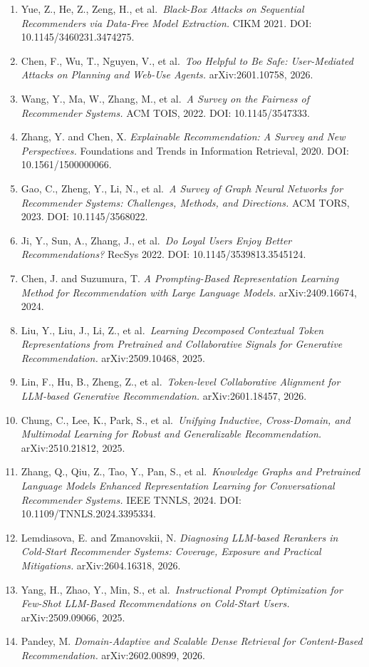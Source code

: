 \begin{enumerate}
\item
  Yue, Z., He, Z., Zeng, H., et al.~\emph{Black-Box Attacks on Sequential Recommenders via Data-Free Model Extraction.} CIKM 2021. DOI: 10.1145/3460231.3474275.
\item
  Chen, F., Wu, T., Nguyen, V., et al.~\emph{Too Helpful to Be Safe: User-Mediated Attacks on Planning and Web-Use Agents.} arXiv:2601.10758, 2026.
\item
  Wang, Y., Ma, W., Zhang, M., et al.~\emph{A Survey on the Fairness of Recommender Systems.} ACM TOIS, 2022. DOI: 10.1145/3547333.
\item
  Zhang, Y. and Chen, X. \emph{Explainable Recommendation: A Survey and New Perspectives.} Foundations and Trends in Information Retrieval, 2020. DOI: 10.1561/1500000066.
\item
  Gao, C., Zheng, Y., Li, N., et al.~\emph{A Survey of Graph Neural Networks for Recommender Systems: Challenges, Methods, and Directions.} ACM TORS, 2023. DOI: 10.1145/3568022.
\item
  Ji, Y., Sun, A., Zhang, J., et al.~\emph{Do Loyal Users Enjoy Better Recommendations?} RecSys 2022. DOI: 10.1145/3539813.3545124.
\item
  Chen, J. and Suzumura, T. \emph{A Prompting-Based Representation Learning Method for Recommendation with Large Language Models.} arXiv:2409.16674, 2024.
\item
  Liu, Y., Liu, J., Li, Z., et al.~\emph{Learning Decomposed Contextual Token Representations from Pretrained and Collaborative Signals for Generative Recommendation.} arXiv:2509.10468, 2025.
\item
  Lin, F., Hu, B., Zheng, Z., et al.~\emph{Token-level Collaborative Alignment for LLM-based Generative Recommendation.} arXiv:2601.18457, 2026.
\item
  Chung, C., Lee, K., Park, S., et al.~\emph{Unifying Inductive, Cross-Domain, and Multimodal Learning for Robust and Generalizable Recommendation.} arXiv:2510.21812, 2025.
\item
  Zhang, Q., Qiu, Z., Tao, Y., Pan, S., et al.~\emph{Knowledge Graphs and Pretrained Language Models Enhanced Representation Learning for Conversational Recommender Systems.} IEEE TNNLS, 2024. DOI: 10.1109/TNNLS.2024.3395334.
\item
  Lemdiasova, E. and Zmanovskii, N. \emph{Diagnosing LLM-based Rerankers in Cold-Start Recommender Systems: Coverage, Exposure and Practical Mitigations.} arXiv:2604.16318, 2026.
\item
  Yang, H., Zhao, Y., Min, S., et al.~\emph{Instructional Prompt Optimization for Few-Shot LLM-Based Recommendations on Cold-Start Users.} arXiv:2509.09066, 2025.
\item
  Pandey, M. \emph{Domain-Adaptive and Scalable Dense Retrieval for Content-Based Recommendation.} arXiv:2602.00899, 2026.
\end{enumerate}
